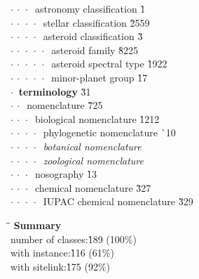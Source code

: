 \begin{tabbing}
$\cdot\:\cdot\:\cdot\:$  astronomy classification  \` 1\\
$\cdot\:\cdot\:\cdot\:\cdot\:$  stellar classification  \` 25{\raisebox{.4\height}{\scalebox{.6}{+}}}59\\
$\cdot\:\cdot\:\cdot\:\cdot\:$  asteroid classification  \` 3\\
$\cdot\:\cdot\:\cdot\:\cdot\:\cdot\:$  asteroid family  \` 82{\raisebox{.4\height}{\scalebox{.6}{+}}}25\\
$\cdot\:\cdot\:\cdot\:\cdot\:\cdot\:$  asteroid spectral type  \` 19{\raisebox{.4\height}{\scalebox{.6}{+}}}22\\
$\cdot\:\cdot\:\cdot\:\cdot\:\cdot\:$  minor-planet group  \` 1{\raisebox{.4\height}{\scalebox{.6}{+}}}7\\
$\cdot\:$  \textbf{terminology}  \` 3{\raisebox{.4\height}{\scalebox{.6}{+}}}1\\
$\cdot\:\cdot\:$  nomenclature  \` 7{\raisebox{.4\height}{\scalebox{.6}{+}}}25\\
$\cdot\:\cdot\:\cdot\:$  biological nomenclature  \` 12{\raisebox{.4\height}{\scalebox{.6}{+}}}12\\
$\cdot\:\cdot\:\cdot\:\cdot\:$  phylogenetic nomenclature  \` {\raisebox{.4\height}{\scalebox{.6}{+}}}10\\
$\cdot\:\cdot\:\cdot\:\cdot\:$  \textit{botanical nomenclature}\\
$\cdot\:\cdot\:\cdot\:\cdot\:$  \textit{zoological nomenclature}\\
$\cdot\:\cdot\:\cdot\:$  nosography  \` 1{\raisebox{.4\height}{\scalebox{.6}{+}}}3\\
$\cdot\:\cdot\:\cdot\:$  chemical nomenclature  \` 3{\raisebox{.4\height}{\scalebox{.6}{+}}}27\\
$\cdot\:\cdot\:\cdot\:\cdot\:$  IUPAC chemical nomenclature  \` 3{\raisebox{.4\height}{\scalebox{.6}{+}}}29\\
\end{tabbing}

\vfill
\begin{tabbing}
\hspace*{15mm}\=\hspace*{32mm}\=\kill
\>\textbf{Summary}\\
\>number of classes:\`189 (100\%)\\
\>with instance:\`116 (61\%)\\
\>with sitelink:\`175 (92\%)
\end{tabbing}
